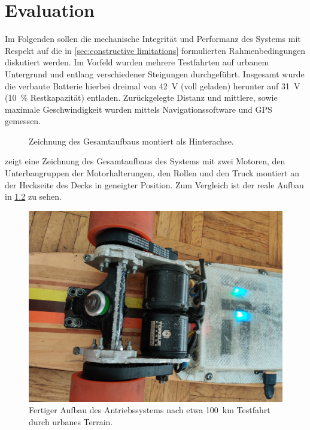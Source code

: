 \chapter{Evaluation}
	Im Folgenden sollen die mechanische Integrität und Performanz des Systems mit Respekt auf die in \cref{sec:constructive limitations} formulierten Rahmenbedingungen diskutiert werden.
	Im Vorfeld wurden mehrere Testfahrten auf urbanem Untergrund und entlang verschiedener Steigungen durchgeführt.
	Insgesamt wurde die verbaute Batterie hierbei dreimal von \qty{42}{\volt} (voll geladen) herunter auf \qty{31}{\volt} (\qty{10}{\percent} Restkapazität) entladen.
	Zurückgelegte Distanz und mittlere, sowie maximale Geschwindigkeit wurden mittels Navigationssoftware und GPS gemessen.
	\begin{figure}[h]
		\centering
		
		\caption[Zeichnung des Gesamtaufbaus]{Zeichnung des Gesamtaufbaus montiert als Hinterachse.}
		\label{fig:drivetrain inclined}
	\end{figure}
	 zeigt eine Zeichnung des Gesamtaufbaus des Systems mit zwei Motoren, den Unterbaugruppen der Motorhalterungen, den Rollen und den Truck montiert an der Heckseite des Decks in geneigter Position.
	Zum Vergleich ist der reale Aufbau in \cref{fig:real world assembly} zu sehen.
	\begin{figure}[h]
		\centering
		\includegraphics[angle=180, width=.5\textwidth]{Footage/Pictures/Drivetrain close up v2.jpg}
		\caption[Fertiger Aufbau des Antriebssystems]{Fertiger Aufbau des Antriebssystems nach etwa \qty{100}{\kilo\metre} Testfahrt durch urbanes Terrain.}
		\label{fig:real world assembly}
	\end{figure}

